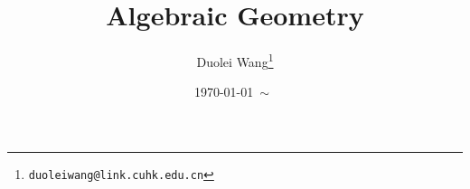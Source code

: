 \title{Algebraic Geometry}
\author{
	Duolei Wang\footnote{
		\texttt{duoleiwang@link.cuhk.edu.cn}
	} \\
}
\date{\today~\( \sim \)~}

